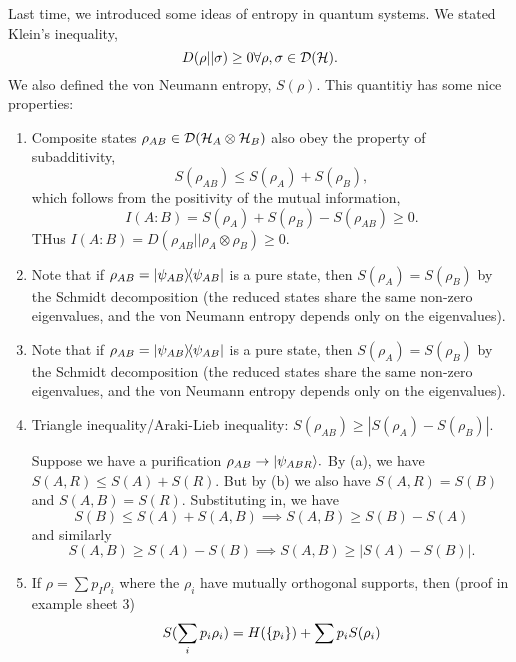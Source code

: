Last time, we introduced some ideas of entropy in quantum systems. We stated Klein's inequality,
\begin{equation}
    D(\rho||\sigma)\geq 0 \forall \rho,\sigma \in \mathcal{D}(\mathcal H).
\end{equation}
We also defined the von Neumann entropy, $S(\rho)$. This quantitiy has some nice properties:
\begin{enumerate}
    \item Composite states $\rho_{AB}\in \mathcal{D}(\mathcal H_A \otimes \mathcal H_B)$ also obey the property of subadditivity,
    \begin{equation}
        S(\rho_{AB})\leq S(\rho_A) + S(\rho_B),
    \end{equation}
    which follows from the positivity of the mutual information,
    \begin{equation}
        I(A:B)=S(\rho_A)+S(\rho_B)-S(\rho_{AB})\geq 0.
    \end{equation}
    THus $I(A:B)=D(\rho_{AB}||\rho_A \otimes \rho_B)\geq 0$.
    \item Note that if $\rho_{AB}=\left\lvert{\psi_{AB}}\middle\rangle\!\middle\langle{\psi_{AB}}\right\rvert$ is a pure state, then $S(\rho_A)=S(\rho_B)$ by the Schmidt decomposition (the reduced states share the same non-zero eigenvalues, and the von Neumann entropy depends only on the eigenvalues).
    \item Note that if $\rho_{AB}=\left\lvert{\psi_{AB}}\middle\rangle\!\middle\langle{\psi_{AB}}\right\rvert$ is a pure state, then $S(\rho_A)=S(\rho_B)$ by the Schmidt decomposition (the reduced states share the same non-zero eigenvalues, and the von Neumann entropy depends only on the eigenvalues).
    \item Triangle inequality/Araki-Lieb inequality: $S(\rho_{AB})\geq |S(\rho_A)-S(\rho_B)|$.
    
    Suppose we have a purification $\rho_{AB}\to \lvert\psi_{ABR}\rangle.$ By (a), we have $S(A,R) \leq S(A)+S(R).$
    But by (b) we also have $S(A,R)=S(B)$ and $S(A,B)=S(R).$ Substituting in, we have
    \begin{equation}
        S(B) \leq S(A)+S(A,B) \implies S(A,B) \geq S(B)- S(A)
    \end{equation}
    and similarly
    \begin{equation}
        S(A,B) \geq S(A) -S(B) \implies S(A,B) \geq |S(A)-S(B)|.
    \end{equation}
    \item If $\rho=\sum p_I \rho_i$ where the $\rho_i$ have mutually orthogonal supports, then (proof in example sheet 3)
    \begin{equation}
        S(\sum_i p_i \rho_i) = H(\{p_i\}) +\sum p_i S(\rho_i)
    \end{equation}
\end{enumerate}

